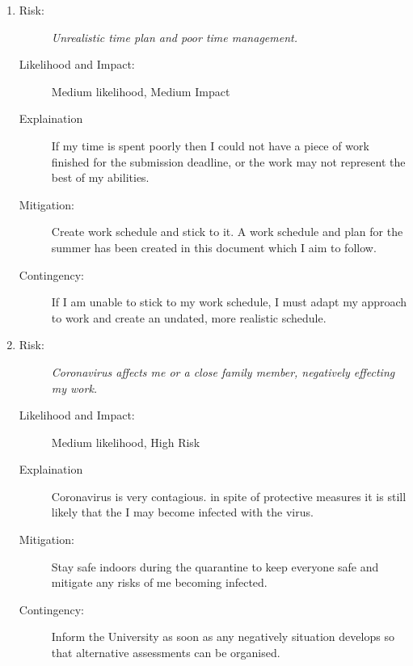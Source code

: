 \documentclass{article}
\begin{document}

\begin{enumerate}
    \item 
    \begin{description}
        \item[Risk:]    
        \emph{Unrealistic time plan and poor time management.}
        \item[Likelihood and Impact:]
        Medium likelihood, Medium Impact
        \item[Explaination]
        If my time is spent poorly then I could not have a piece of work finished for the submission deadline, or the work may not represent the best of my abilities.  
        \item[Mitigation:]
        Create work schedule and stick to it.
        A work schedule and plan for the summer has been created in this document which I aim to follow.
        \item[Contingency:]
        If I am unable to stick to my work schedule, I must adapt my approach to work and create an undated, more realistic schedule.
    \end{description}

    \item 
    \begin{description}
        \item[Risk:]
        \emph{Coronavirus affects me or a close family member, negatively effecting my work.}
        \item[Likelihood and Impact:]
        Medium likelihood, High Risk
        \item[Explaination]
        Coronavirus is very contagious. 
        in spite of protective measures it is still likely that the I may become infected with the virus. 
        \item[Mitigation:]
        Stay safe indoors during the quarantine to keep everyone safe and mitigate any risks of me becoming infected.
        \item[Contingency:]
        Inform the University as soon as any negatively situation develops so that alternative assessments can be organised.
    \end{description}


\end{enumerate}
\end{document}
